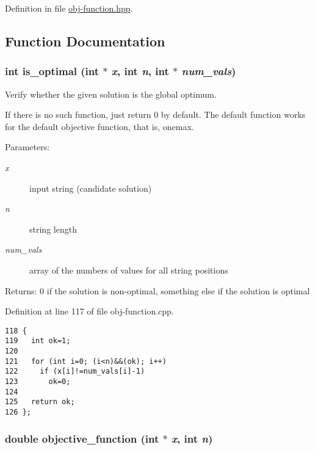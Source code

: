 Definition in file \hyperlink{obj-function_8hpp-source}{obj-function.hpp}.

\subsection{Function Documentation}
\hypertarget{obj-function_8hpp_39144c50109e3a793e1aecd4014ece28}{
\subsubsection[is\_\-optimal]{\setlength{\rightskip}{0pt plus 5cm}int is\_\-optimal (int $\ast$ {\em x}, int {\em n}, int $\ast$ {\em num\_\-vals})}}
\label{obj-function_8hpp_39144c50109e3a793e1aecd4014ece28}


Verify whether the given solution is the global optimum. 

If there is no such function, just return 0 by default. The default function works for the default objective function, that is, onemax.

\begin{Desc}
\item[Parameters:]
\begin{description}
\item[{\em x}]input string (candidate solution) \item[{\em n}]string length \item[{\em num\_\-vals}]array of the numbers of values for all string positions\end{description}
\end{Desc}
\begin{Desc}
\item[Returns:]0 if the solution is non-optimal, something else if the solution is optimal \end{Desc}


Definition at line 117 of file obj-function.cpp.

\begin{Code}\begin{verbatim}118 {
119   int ok=1;
120 
121   for (int i=0; (i<n)&&(ok); i++)
122     if (x[i]!=num_vals[i]-1)
123       ok=0;
124 
125   return ok;
126 };
\end{verbatim}\end{Code}


\hypertarget{obj-function_8hpp_633957adde57ee545797def8e74eb8e4}{
\subsubsection[objective\_\-function]{\setlength{\rightskip}{0pt plus 5cm}double objective\_\-function (int $\ast$ {\em x}, int {\em n})}}
\label{obj-function_8hpp_633957adde57ee545797def8e74eb8e4}


